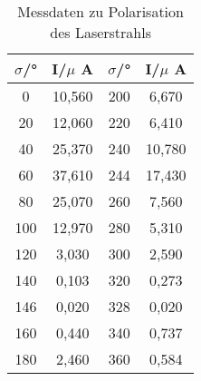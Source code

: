 \begin{table}[h!]
  \centering
  \caption{Messdaten zu Polarisation des Laserstrahls}
  \label{tab:polatisation}
  \begin{tabular}{c c c c}
    \toprule
      $\sigma$/° & I/$\mu$ A & $\sigma$/° & I/$\mu$ A \\
      \midrule
        0 & 10,560 &   200 &  6,670 \\
       20 & 12,060 &   220 &  6,410 \\
       40 & 25,370 &   240 & 10,780 \\
       60 & 37,610 &   244 & 17,430 \\
       80 & 25,070 &   260 &  7,560 \\
      100 & 12,970 &   280 &  5,310 \\
      120 &  3,030 &   300 &  2,590 \\
      140 &  0,103 &   320 &  0,273 \\
      146 &  0,020 &   328 &  0,020 \\
      160 &  0,440 &   340 &  0,737 \\
      180 &  2,460 &   360 &  0,584 \\
    \bottomrule
  \end{tabular}
\end{table}

%
